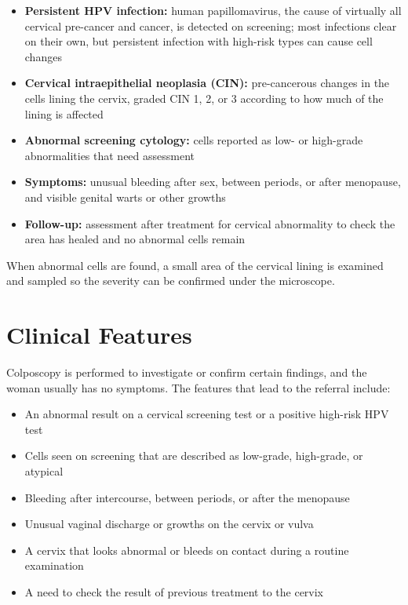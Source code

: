 \begin{itemize}
    \item \textbf{Persistent HPV infection:} human papillomavirus, the cause of virtually all cervical pre-cancer and cancer, is detected on screening; most infections clear on their own, but persistent infection with high-risk types can cause cell changes
    \item \textbf{Cervical intraepithelial neoplasia (CIN):} pre-cancerous changes in the cells lining the cervix, graded CIN 1, 2, or 3 according to how much of the lining is affected
    \item \textbf{Abnormal screening cytology:} cells reported as low- or high-grade abnormalities that need assessment
    \item \textbf{Symptoms:} unusual bleeding after sex, between periods, or after menopause, and visible genital warts or other growths
    \item \textbf{Follow-up:} assessment after treatment for cervical abnormality to check the area has healed and no abnormal cells remain
\end{itemize}

When abnormal cells are found, a small area of the cervical lining is examined and sampled so the severity can be confirmed under the microscope.

\section*{Clinical Features}
Colposcopy is performed to investigate or confirm certain findings, and the woman usually has no symptoms. The features that lead to the referral include:

\begin{itemize}
    \item An abnormal result on a cervical screening test or a positive high-risk HPV test
    \item Cells seen on screening that are described as low-grade, high-grade, or atypical
    \item Bleeding after intercourse, between periods, or after the menopause
    \item Unusual vaginal discharge or growths on the cervix or vulva
    \item A cervix that looks abnormal or bleeds on contact during a routine examination
    \item A need to check the result of previous treatment to the cervix
\end{itemize}

